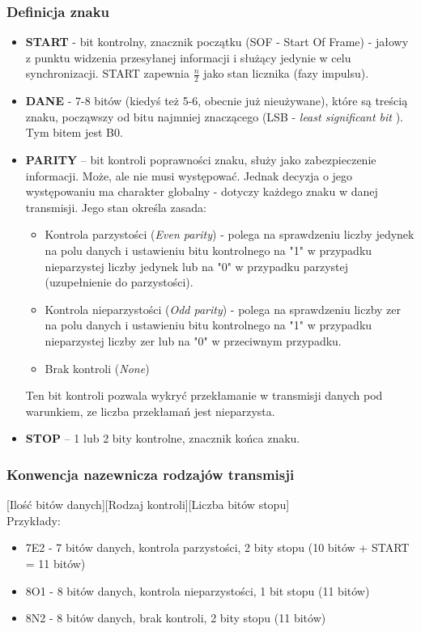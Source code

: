 		\subsubsection{Definicja znaku}
		\begin{itemize}
			\item \textbf{START} - bit kontrolny, znacznik początku (SOF - Start Of Frame) - jałowy z punktu widzenia przesyłanej informacji i służący jedynie w celu synchronizacji. START zapewnia $\frac{n}{2}$ jako stan licznika (fazy impulsu).
			\item \textbf{DANE} - 7-8 bitów (kiedyś też 5-6, obecnie już nieużywane), które są treścią znaku, począwszy od bitu najmniej znaczącego (LSB - \emph{least significant bit }). Tym bitem jest B0.
			\item \textbf{PARITY} – bit kontroli poprawności znaku, służy jako zabezpieczenie informacji. Może, ale nie musi występować. Jednak decyzja o jego występowaniu ma charakter globalny - dotyczy każdego znaku w danej transmisji. Jego stan określa zasada:
			\begin{itemize}
				\item Kontrola parzystości (\emph{Even parity}) - polega na sprawdzeniu liczby jedynek na polu danych i ustawieniu bitu kontrolnego na "1" w przypadku nieparzystej liczby jedynek lub na "0" w przypadku parzystej (uzupełnienie do parzystości).
				\item Kontrola nieparzystości (\emph{Odd parity}) - polega na sprawdzeniu liczby zer na polu danych i ustawieniu bitu kontrolnego na "1" w przypadku nieparzystej liczby zer lub na "0" w przeciwnym przypadku.
				\item Brak kontroli (\emph{None})
			\end{itemize}
			Ten bit kontroli pozwala wykryć przekłamanie w transmisji danych pod warunkiem, ze liczba przekłamań jest nieparzysta.
			\item \textbf{STOP} – 1 lub 2 bity kontrolne, znacznik końca znaku.
		\end{itemize}
		\subsubsection{Konwencja nazewnicza rodzajów transmisji}
			[Ilość bitów danych][Rodzaj kontroli][Liczba bitów stopu]\\Przykłady:
			\begin{itemize}
				\item 7E2 - 7 bitów danych, kontrola parzystości, 2 bity stopu (10 bitów + START = 11 bitów)
				\item 8O1 - 8 bitów danych, kontrola nieparzystości, 1 bit stopu (11 bitów)
				\item 8N2 - 8 bitów danych, brak kontroli, 2 bity stopu (11 bitów)
			\end{itemize}
